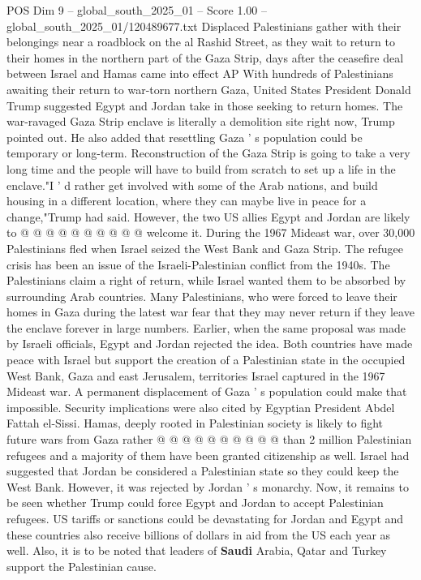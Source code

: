 \begin{textsample}{POS Dim 9 – global\_south\_2025\_01 – Score 1.00 – global\_south\_2025\_01/120489677.txt}  \label{ex:f9_pos_310}
Displaced Palestinians gather with their belongings near a roadblock on the al Rashid Street, as they wait to return to their homes in the northern part of the Gaza Strip, days after the ceasefire deal between Israel and Hamas came into effect AP With hundreds of Palestinians awaiting their return to war-torn northern Gaza, United States President Donald Trump suggested Egypt and Jordan take in those seeking to return homes.
The war-ravaged Gaza Strip enclave is literally a demolition site right now, Trump pointed out.
He also added that resettling Gaza ' s population could be temporary or long-term.
Reconstruction of the Gaza Strip is going to take a very long time and the people will have to build from scratch to set up a life in the enclave."I ' d rather get involved with some of the Arab nations, and build housing in a different location, where they can maybe live in peace for a change,"Trump had said.
However, the two US allies Egypt and Jordan are likely to @ @ @ @ @ @ @ @ @ @ welcome it.
During the 1967 Mideast war, over 30,000 Palestinians fled when Israel seized the West Bank and Gaza Strip.
The refugee crisis has been an issue of the Israeli-Palestinian conflict from the 1940s.
The Palestinians claim a right of return, while Israel wanted them to be absorbed by surrounding Arab countries.
Many Palestinians, who were forced to leave their homes in Gaza during the latest war fear that they may never return if they leave the enclave forever in large numbers.
Earlier, when the same proposal was made by Israeli officials, Egypt and Jordan rejected the idea.
Both countries have made peace with Israel but support the creation of a Palestinian state in the occupied West Bank, Gaza and east Jerusalem, territories Israel captured in the 1967 Mideast war.
A permanent displacement of Gaza ' s population could make that impossible.
Security implications were also cited by Egyptian President Abdel Fattah el-Sissi.
Hamas, deeply rooted in Palestinian society is likely to fight future wars from Gaza rather @ @ @ @ @ @ @ @ @ @ than 2 million Palestinian refugees and a majority of them have been granted citizenship as well.
Israel had suggested that Jordan be considered a Palestinian state so they could keep the West Bank.
However, it was rejected by Jordan ' s monarchy.
Now, it remains to be seen whether Trump could force Egypt and Jordan to accept Palestinian refugees.
US tariffs or sanctions could be devastating for Jordan and Egypt and these countries also receive billions of dollars in aid from the US each year as well.
Also, it is to be noted that leaders of \textbf{Saudi} Arabia, Qatar and Turkey support the Palestinian cause.

\end{textsample}
